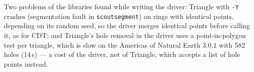 \documentclass[11pt,a4paper]{article}
\newcommand{\code}[1]{\texttt{#1}}
\begin{document}
\noindent Two problems of the libraries found while writing the driver: Triangle with \code{-Y}
crashes (segmentation fault in \code{scoutsegment}) on rings with identical points, depending on
its random seed, so the driver merges identical points before calling it, as for CDT; and
Triangle's hole removal in the driver uses a point-in-polygon test per triangle, which is slow on
the Americas of Natural Earth 3.0.1 with 582 holes (14\,s) --- a cost of the driver, not of Triangle, which accepts a list of
hole points instead.
\end{document}
